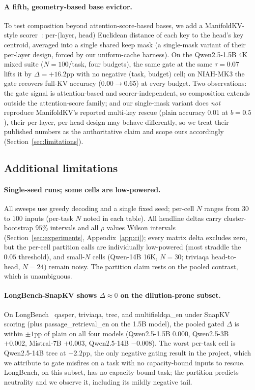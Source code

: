 \documentclass{article}
\begin{document}
\paragraph{A fifth, geometry-based base evictor.} To test composition
beyond attention-score-based bases, we add a ManifoldKV-style
scorer~\citep{arxiv260208343}: per-(layer, head) Euclidean distance of
each key to the head's key centroid, averaged into a single shared keep
mask (a single-mask variant of their per-layer design, forced by our
uniform-cache harness). On the Qwen2.5-1.5B 4K mixed suite
($N = 100$/task, four budgets), the same gate at the same $\tau = 0.07$
lifts it by $\Delta = +16.2$pp with no negative (task, budget) cell; on
NIAH-MK3 the gate recovers full-KV accuracy ($0.00 \to 0.65$) at every
budget. Two observations: the gate signal is attention-based and
scorer-independent, so composition extends outside the attention-score
family; and our single-mask variant does \emph{not} reproduce
ManifoldKV's reported multi-key rescue (plain accuracy $0.01$ at
$b = 0.5$), their per-layer, per-head design may behave differently,
so we treat their published numbers as the authoritative claim and scope
ours accordingly (Section~\ref{sec:limitations}).

\subsection{Additional limitations}

\paragraph{Single-seed runs; some cells are low-powered.} All sweeps
use greedy decoding and a single fixed seed; per-cell $N$ ranges from
$30$ to $100$ inputs (per-task $N$ noted in each table). All headline
deltas carry cluster-bootstrap $95\%$ intervals and all $\rho$ values
Wilson intervals (Section~\ref{sec:experiments},
Appendix~\ref{app:ci}); every matrix delta excludes zero, but the
per-cell partition calls are individually low-powered (most straddle
the $0.05$ threshold), and small-$N$ cells (Qwen-14B 16K, $N = 30$;
triviaqa head-to-head, $N = 24$) remain noisy. The partition claim
rests on the pooled contrast, which is unambiguous.

\paragraph{LongBench-SnapKV shows $\Delta \approx 0$ on the
dilution-prone subset.} On LongBench~\citep{arxiv230814508} qasper,
triviaqa, trec, and multifieldqa\_en under SnapKV scoring (plus
passage\_retrieval\_en on the 1.5B model), the pooled gated $\Delta$ is
within $\pm 1$pp of plain on all four models (Qwen2.5-1.5B $0.000$,
Qwen2.5-3B $+0.002$, Mistral-7B $+0.003$, Qwen2.5-14B $-0.008$). The
worst per-task cell is Qwen2.5-14B trec at $-2.2$pp, the only negative
gating result in the project, which we attribute to gate misfires on a
task with no capacity-bound inputs to rescue. LongBench, on this
subset, has no capacity-bound task; the partition predicts neutrality
and we observe it, including its mildly negative tail.
\end{document}
